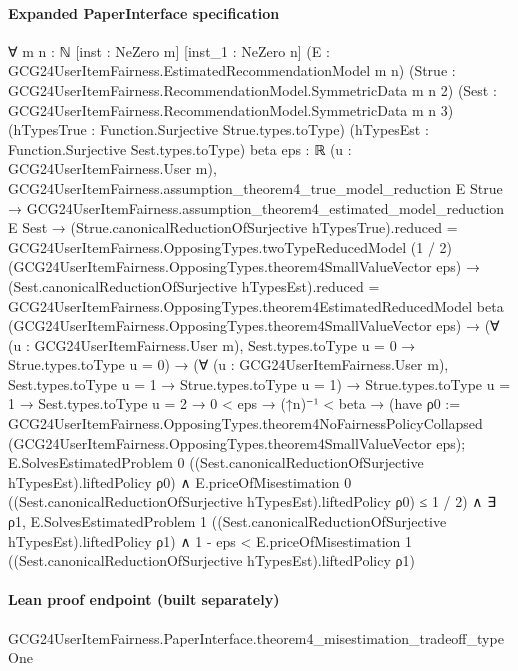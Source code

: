 \documentclass[10pt]{article}
\begin{document}
\paragraph{Expanded PaperInterface specification}
\begin{ReviewVerbatim}
∀ {m n : ℕ} [inst : NeZero m] [inst_1 : NeZero n] (E : GCG24UserItemFairness.EstimatedRecommendationModel m n)
  (Strue : GCG24UserItemFairness.RecommendationModel.SymmetricData m n 2)
  (Sest : GCG24UserItemFairness.RecommendationModel.SymmetricData m n 3)
  (hTypesTrue : Function.Surjective Strue.types.toType) (hTypesEst : Function.Surjective Sest.types.toType)
  {beta eps : ℝ} (u : GCG24UserItemFairness.User m),
  GCG24UserItemFairness.assumption_theorem4_true_model_reduction E Strue →
    GCG24UserItemFairness.assumption_theorem4_estimated_model_reduction E Sest →
      (Strue.canonicalReductionOfSurjective hTypesTrue).reduced =
          GCG24UserItemFairness.OpposingTypes.twoTypeReducedModel (1 / 2)
            (GCG24UserItemFairness.OpposingTypes.theorem4SmallValueVector eps) →
        (Sest.canonicalReductionOfSurjective hTypesEst).reduced =
            GCG24UserItemFairness.OpposingTypes.theorem4EstimatedReducedModel beta
              (GCG24UserItemFairness.OpposingTypes.theorem4SmallValueVector eps) →
          (∀ (u : GCG24UserItemFairness.User m), Sest.types.toType u = 0 → Strue.types.toType u = 0) →
            (∀ (u : GCG24UserItemFairness.User m), Sest.types.toType u = 1 → Strue.types.toType u = 1) →
              Strue.types.toType u = 1 →
                Sest.types.toType u = 2 →
                  0 < eps →
                    (↑n)⁻¹ < beta →
                      (have ρ0 :=
                          GCG24UserItemFairness.OpposingTypes.theorem4NoFairnessPolicyCollapsed
                            (GCG24UserItemFairness.OpposingTypes.theorem4SmallValueVector eps);
                        E.SolvesEstimatedProblem 0 ((Sest.canonicalReductionOfSurjective hTypesEst).liftedPolicy ρ0) ∧
                          E.priceOfMisestimation 0 ((Sest.canonicalReductionOfSurjective hTypesEst).liftedPolicy ρ0) ≤
                            1 / 2) ∧
                        ∃ ρ1,
                          E.SolvesEstimatedProblem 1 ((Sest.canonicalReductionOfSurjective hTypesEst).liftedPolicy ρ1) ∧
                            1 - eps <
                              E.priceOfMisestimation 1 ((Sest.canonicalReductionOfSurjective hTypesEst).liftedPolicy ρ1)
\end{ReviewVerbatim}

\paragraph{Lean proof endpoint (built separately)}\begin{ReviewVerbatim}
GCG24UserItemFairness.PaperInterface.theorem4_misestimation_tradeoff_typeOne
\end{ReviewVerbatim}
\end{document}
